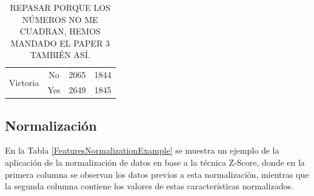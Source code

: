 \documentclass{uathesis-es}
\begin{document}
\begin{table}[H]
\begin{center}
\begin{tabular}{|c|c||c|c|}
        \multirow{2}{*}{Victoria} &
            No   & 2065  & 1844  \\ &
            Yes  & 2649  & 1845 \\ \hline \hline
		\end{tabular}
	\end{center}
	\caption{REPASAR PORQUE LOS NÚMEROS NO ME CUADRAN, HEMOS MANDADO EL PAPER 3 TAMBIÉN ASÍ.}
	\label{Resampling}
\end{table}


\subsection{Normalización}

En la Tabla \ref{FeaturesNormalizationExample} se muestra un ejemplo de la aplicación de la normalización de datos en base a la técnica Z-Score, donde en la primera columna se observan los datos previos a esta normalización, mientras que la segunda columna contiene los valores de estas características normalizados.
\end{document}
